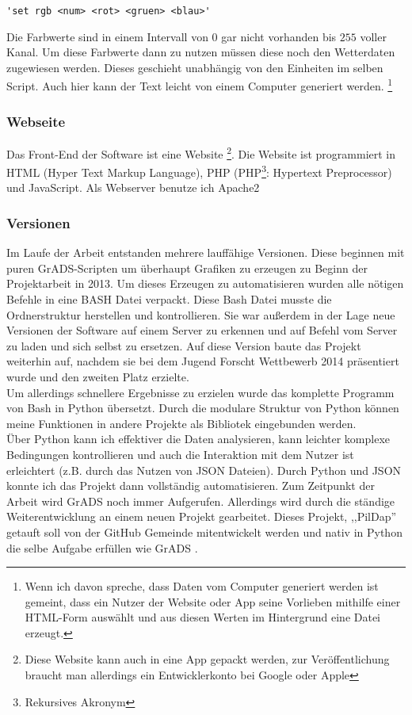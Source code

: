 \begin{lstlisting}[language=grads]
	'set rgb <num> <rot> <gruen> <blau>'
\end{lstlisting}

Die Farbwerte sind in einem Intervall von $0$ gar nicht vorhanden bis $255$ voller Kanal.
Um diese Farbwerte dann zu nutzen müssen diese noch den Wetterdaten zugewiesen werden.
Dieses geschieht unabhängig von den Einheiten im selben Script.
Auch hier kann der Text leicht von einem Computer generiert werden.
\footnote{Wenn ich davon spreche, dass Daten vom Computer generiert werden ist gemeint,
dass ein Nutzer der Website oder App seine Vorlieben mithilfe einer HTML-Form auswählt
und aus diesen Werten im Hintergrund eine Datei erzeugt.}


\subsubsection*{Webseite}
Das Front-End der Software ist eine Website
\footnote{Diese Website kann auch in eine App gepackt werden,
zur Veröffentlichung braucht man allerdings ein Entwicklerkonto bei Google oder Apple}.
Die Website ist programmiert in HTML (Hyper Text Markup Language),
PHP (PHP\footnote{Rekursives Akronym}: Hypertext Preprocessor) und JavaScript.
Als Webserver benutze ich Apache2 \cite{php} \cite{apache} \\

\subsubsection{Versionen}
Im Laufe der Arbeit entstanden mehrere lauffähige Versionen.
Diese beginnen mit puren GrADS-Scripten um überhaupt Grafiken
zu erzeugen zu Beginn der Projektarbeit in 2013.
Um dieses Erzeugen zu automatisieren wurden alle nötigen Befehle in eine BASH Datei verpackt.
Diese Bash Datei musste die Ordnerstruktur herstellen und kontrollieren.
Sie war außerdem in der Lage neue Versionen der Software auf einem Server zu erkennen
und auf Befehl vom Server zu laden und sich selbst zu ersetzen.
Auf diese Version baute das Projekt weiterhin auf,
nachdem sie bei dem Jugend Forscht Wettbewerb 2014
präsentiert wurde und den zweiten Platz erzielte.\\
Um allerdings schnellere Ergebnisse zu erzielen wurde
das komplette Programm von Bash in Python übersetzt.
Durch die modulare Struktur von Python können meine
Funktionen in andere Projekte als Bibliotek eingebunden werden.\\
Über Python kann ich effektiver die Daten analysieren,
kann leichter komplexe Bedingungen kontrollieren und
auch die Interaktion mit dem Nutzer ist erleichtert
(z.B. durch das Nutzen von JSON Dateien).
Durch Python und JSON konnte ich das Projekt dann vollständig automatisieren.
Zum Zeitpunkt der Arbeit wird GrADS noch immer Aufgerufen. Allerdings
wird durch die ständige Weiterentwicklung an einem neuen Projekt gearbeitet.
Dieses Projekt, ,,PilDap'' getauft soll von der GitHub Gemeinde mitentwickelt
werden und nativ in Python die selbe Aufgabe erfüllen wie GrADS \cite{pildap}.

